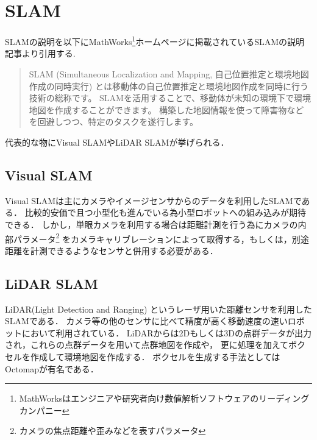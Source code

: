 \section{SLAM}
\label{slam}
SLAMの説明を以下にMathWorks\footnote{MathWorksはエンジニアや研究者向け数値解析ソフトウェアのリーディングカンパニー}ホームページに掲載されているSLAMの説明記事より引用する.

\begin{quotation}
SLAM (Simultaneous Localization and Mapping, 自己位置推定と環境地図作成の同時実行) とは移動体の自己位置推定と環境地図作成を同時に行う技術の総称です。
SLAMを活用することで、移動体が未知の環境下で環境地図を作成することができます。
構築した地図情報を使って障害物などを回避しつつ、特定のタスクを遂行します。
\end{quotation}

代表的な物にVisual SLAMやLiDAR SLAMが挙げられる．\cite{slam_mathwork}

\subsection{Visual SLAM}
Visual SLAMは主にカメラやイメージセンサからのデータを利用したSLAMである．
比較的安価で且つ小型化も進んでいる為小型ロボットへの組み込みが期待できる．
しかし，単眼カメラを利用する場合は距離計測を行う為にカメラの内部パラメータ\footnote{カメラの焦点距離や歪みなどを表すパラメータ}
をカメラキャリブレーションによって取得する，もしくは，別途距離を計測できるようなセンサと併用する必要がある．

\subsection{LiDAR SLAM}
LiDAR(Light Detection and Ranging) というレーザ用いた距離センサを利用したSLAMである．
カメラ等の他のセンサに比べて精度が高く移動速度の速いロボットにおいて利用されている．
LiDARからは2Dもしくは3Dの点群データが出力され，これらの点群データを用いて点群地図を作成や，
更に処理を加えてボクセルを作成して環境地図を作成する．
ボクセルを生成する手法としてはOctomap\cite{Octomap}が有名である．
